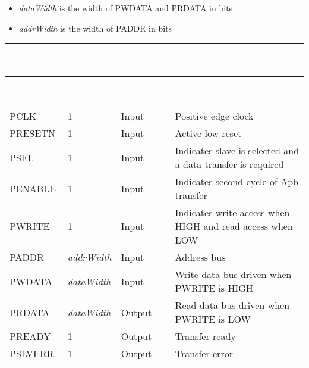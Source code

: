 \begin{itemize}[noitemsep]
  \item \textit{dataWidth} is the width of PWDATA and PRDATA in bits
  \item \textit{addrWidth} is the width of PADDR in bits
\end{itemize}
 
\renewcommand*{\arraystretch}{1.4}

\begingroup
\small
{} %
\begin{longtable}[H]{
  | p{}
  | p{}
  | p{}
  | p{} |
  }

  \hline
  \rowcolor{gray}
  \textcolor{white}{\textbf{Port Name}} & 
  \textcolor{white}{\textbf{Width}} & 
  \textcolor{white}{\textbf{Direction}} & 
  \textcolor{white}{\textbf{Description}} \\ \hline
  \endfirsthead

  \hline
  \rowcolor{gray}
  \textcolor{white}{\textbf{Port Name}} & 
  \textcolor{white}{\textbf{Width}} & 
  \textcolor{white}{\textbf{Direction}} & 
  \textcolor{white}{\textbf{Description}}\\ \hline
  \endhead

  \hline
  \endfoot


  PCLK &       
  1 &       
  Input &       
  Positive edge clock \\ \hline

  PRESETN &       
  1 &       
  Input &       
  Active low reset \\ \hline

  PSEL &       
  1 & 
  Input &       
  Indicates slave is selected and a data transfer is required \\ \hline

  PENABLE &        
  1 & 
  Input &       
  Indicates second cycle of Apb transfer \\ \hline

  PWRITE &        
  1 & 
  Input &       
  Indicates write access when HIGH and read access when LOW\\ \hline

  PADDR &      
  \textit{addrWidth} & 
  Input &     
  Address bus \\ \hline

  PWDATA &      
  \textit{dataWidth} & 
  Input &     
  Write data bus driven when PWRITE is HIGH\\ \hline

  PRDATA &      
  \textit{dataWidth} & 
  Output &     
  Read data bus driven when PWRITE is LOW\\ \hline
 
  PREADY &        
  1 & 
  Output &       
  Transfer ready \\ \hline

  PSLVERR &        
  1 & 
  Output &       
  Transfer error \\ \hline
  
\end{longtable}
\captionsetup{aboveskip=0pt}
\label{table:interface}
\endgroup
